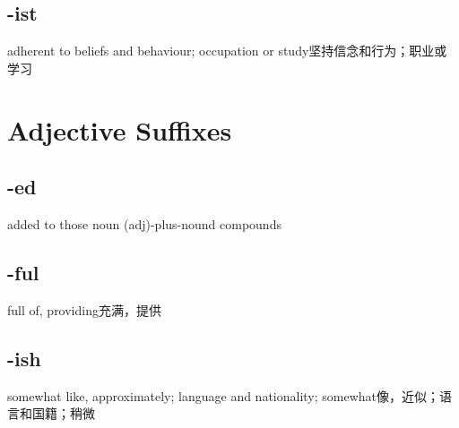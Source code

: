 \subsection{-ist}

\begin{nlist}{adherent to beliefs and behaviour; occupation or study}{坚持信念和行为；职业或学习}
\end{nlist}

\section{Adjective Suffixes}

\subsection{-ed}

\begin{nlist}{added to those noun (adj)-plus-nound compounds}{}
\end{nlist}

\subsection{-ful}

\begin{nlist}{full of, providing}{充满，提供}
\end{nlist}

\subsection{-ish}

\begin{nlist}{somewhat like, approximately; language and nationality; somewhat}{像，近似；语言和国籍；稍微}
\end{nlist}

